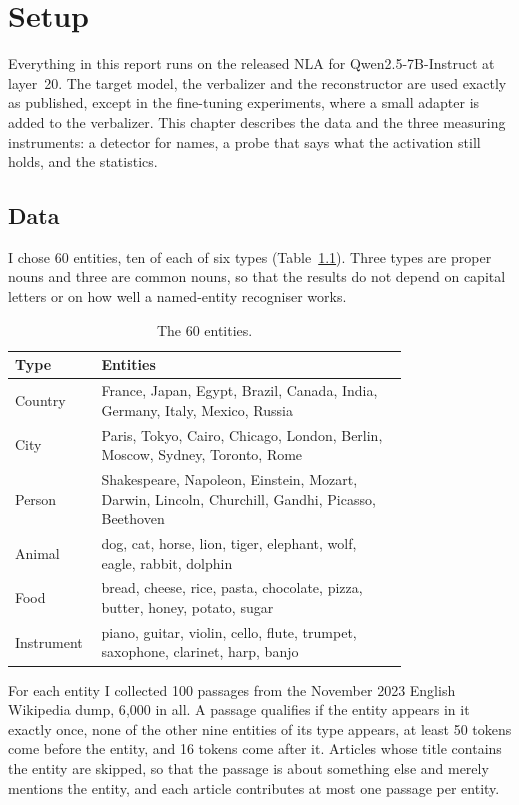 \chapter{Setup}
\label{ch:setup}

Everything in this report runs on the released NLA for Qwen2.5-7B-Instruct at layer~20. The target model,
the verbalizer and the reconstructor are used exactly as published, except in the fine-tuning experiments,
where a small adapter is added to the verbalizer. This chapter describes the data and the three measuring
instruments: a detector for names, a probe that says what the activation still holds, and the statistics.

\section{Data}

I chose 60 entities, ten of each of six types (Table~\ref{tab:entities}). Three types are proper nouns and
three are common nouns, so that the results do not depend on capital letters or on how well a named-entity
recogniser works.

\begin{table}[t]
\centering
\small
\begin{tabular}{@{}lp{0.78\linewidth}@{}}
\toprule
Type & Entities \\
\midrule
Country & France, Japan, Egypt, Brazil, Canada, India, Germany, Italy, Mexico, Russia \\
City & Paris, Tokyo, Cairo, Chicago, London, Berlin, Moscow, Sydney, Toronto, Rome \\
Person & Shakespeare, Napoleon, Einstein, Mozart, Darwin, Lincoln, Churchill, Gandhi, Picasso, Beethoven \\
Animal & dog, cat, horse, lion, tiger, elephant, wolf, eagle, rabbit, dolphin \\
Food & bread, cheese, rice, pasta, chocolate, pizza, butter, honey, potato, sugar \\
Instrument & piano, guitar, violin, cello, flute, trumpet, saxophone, clarinet, harp, banjo \\
\bottomrule
\end{tabular}
\caption{The 60 entities.}
\label{tab:entities}
\end{table}

For each entity I collected 100 passages from the November 2023 English Wikipedia dump, 6{,}000 in all. A
passage qualifies if the entity appears in it exactly once, none of the other nine entities of its type
appears, at least 50 tokens come before the entity, and 16 tokens come after it. Articles whose title
contains the entity are skipped, so that the passage is about something else and merely mentions the entity,
and each article contributes at most one passage per entity.

